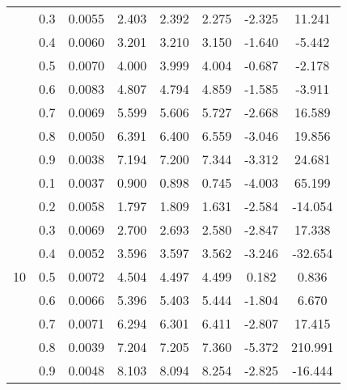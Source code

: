 \documentclass[11pt,a4paper]{report}
\begin{document}
\begin{longtable}{ | c | c || c | c | c | c | c | c | }
 & 0.3 & 0.0055 & 2.403 & 2.392 & 2.275 & -2.325 & 11.241 \\
 & 0.4 & 0.0060 & 3.201 & 3.210 & 3.150 & -1.640 & -5.442 \\
 & 0.5 & 0.0070 & 4.000 & 3.999 & 4.004 & -0.687 & -2.178 \\
 & 0.6 & 0.0083 & 4.807 & 4.794 & 4.859 & -1.585 & -3.911 \\
 & 0.7 & 0.0069 & 5.599 & 5.606 & 5.727 & -2.668 & 16.589 \\
 & 0.8 & 0.0050 & 6.391 & 6.400 & 6.559 & -3.046 & 19.856 \\
 & 0.9 & 0.0038 & 7.194 & 7.200 & 7.344 & -3.312 & 24.681 \\
 \hline
\multirow{9}{*}{10} & 0.1 & 0.0037 & 0.900 & 0.898 & 0.745 & -4.003 & 65.199 \\
 & 0.2 & 0.0058 & 1.797 & 1.809 & 1.631 & -2.584 & -14.054 \\
 & 0.3 & 0.0069 & 2.700 & 2.693 & 2.580 & -2.847 & 17.338 \\
 & 0.4 & 0.0052 & 3.596 & 3.597 & 3.562 & -3.246 & -32.654 \\
 & 0.5 & 0.0072 & 4.504 & 4.497 & 4.499 & 0.182 & 0.836 \\
 & 0.6 & 0.0066 & 5.396 & 5.403 & 5.444 & -1.804 & 6.670 \\
 & 0.7 & 0.0071 & 6.294 & 6.301 & 6.411 & -2.807 & 17.415 \\
 & 0.8 & 0.0039 & 7.204 & 7.205 & 7.360 & -5.372 & 210.991 \\
 & 0.9 & 0.0048 & 8.103 & 8.094 & 8.254 & -2.825 & -16.444 \\
 \hline
\hline
\end{longtable}
\end{document}
